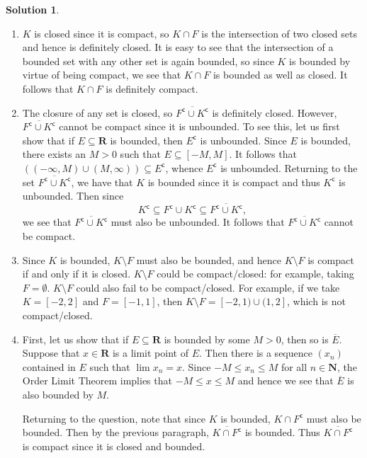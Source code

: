 \documentclass[12pt]{article}
\theoremstyle{definition}
\theoremstyle{exercise}
\theoremstyle{solution}
\newtheorem*{solution}{Solution}
\newcommand{\setcomp}[1]{#1^{\mathsf{c}}}
\newcommand{\N}{\mathbf{N}}
\newcommand{\R}{\mathbf{R}}
\begin{document}
\begin{solution}
    \begin{enumerate}
        \item \( K \) is closed since it is compact, so \( K \cap F \) is the intersection of two closed sets and hence is definitely closed. It is easy to see that the intersection of a bounded set with any other set is again bounded, so since \( K \) is bounded by virtue of being compact, we see that \( K \cap F \) is bounded as well as closed. It follows that \( K \cap F \) is definitely compact.

        \item The closure of any set is closed, so \( \overline{\setcomp{F} \cup \setcomp{K}} \) is definitely closed. However, \( \overline{\setcomp{F} \cup \setcomp{K}} \) cannot be compact since it is unbounded. To see this, let us first show that if \( E \subseteq \R \) is bounded, then \( \setcomp{E} \) is unbounded. Since \( E \) is bounded, there exists an \( M > 0 \) such that \( E \subseteq [-M, M] \). It follows that \( ((-\infty, M) \cup (M, \infty)) \subseteq \setcomp{E} \), whence \( \setcomp{E} \) is unbounded. Returning to the set \( \overline{\setcomp{F} \cup \setcomp{K}} \), we have that \( K \) is bounded since it is compact and thus \( \setcomp{K} \) is unbounded. Then since
        \[
            \setcomp{K} \subseteq \setcomp{F} \cup \setcomp{K} \subseteq \overline{\setcomp{F} \cup \setcomp{K}},
        \]
        we see that \( \overline{\setcomp{F} \cup \setcomp{K}} \) must also be unbounded. It follows that \( \overline{\setcomp{F} \cup \setcomp{K}} \) cannot be compact.

        \item Since \( K \) is bounded, \( K \setminus F \) must also be bounded, and hence \( K \setminus F \) is compact if and only if it is closed. \( K \setminus F \) could be compact/closed: for example, taking \( F = \emptyset \). \( K \setminus F \) could also fail to be compact/closed. For example, if we take \( K = [-2, 2] \) and \( F = [-1, 1] \), then \( K \setminus F = [-2, 1) \cup (1, 2] \), which is not compact/closed.

        \item First, let us show that if \( E \subseteq \R \) is bounded by some \( M > 0 \), then so is \( \overline{E} \). Suppose that \( x \in \R \) is a limit point of \( E \). Then there is a sequence \( (x_n) \) contained in \( E \) such that \( \lim x_n = x \). Since \( -M \leq x_n \leq M \) for all \( n \in \N \), the Order Limit Theorem implies that \( -M \leq x \leq M \) and hence we see that \( \overline{E} \) is also bounded by \( M \).

        Returning to the question, note that since \( K \) is bounded, \( K \cap \setcomp{F} \) must also be bounded. Then by the previous paragraph, \( \overline{K \cap \setcomp{F}} \) is bounded. Thus \( \overline{K \cap \setcomp{F}} \) is compact since it is closed and bounded.
    \end{enumerate}
\end{solution}
\end{document}
